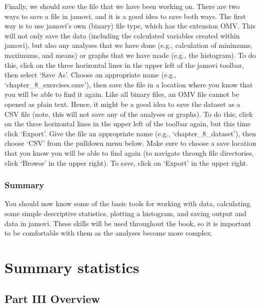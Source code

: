 \documentclass[
  openany]{scrbook}
\begin{document}
Finally, we should save the file that we have been working on.
There are two ways to save a file in jamovi, and it is a good idea to save both ways.
The first way is to use jamovi's own (binary) file type, which has the extension OMV.
This will not only save the data (including the calculated variables created within jamovi), but also any analyses that we have done (e.g., calculation of minimums, maximums, and means) or graphs that we have made (e.g., the histogram).
To do this, click on the three horizontal lines in the upper left of the jamovi toolbar, then select `Save As'.
Choose an appropriate name (e.g., `chapter\_8\_exercises.omv'), then save the file in a location where you know that you will be able to find it again.
Like all binary files, an OMV file cannot be opened as plain text.
Hence, it might be a good idea to save the dataset as a CSV file (note, this will not save any of the analyses or graphs).
To do this, click on the three horizontal lines in the upper left of the toolbar again, but this time click `Export'.
Give the file an appropriate name (e.g., `chapter\_8\_dataset'), then choose `CSV' from the pulldown menu below.
Make sure to choose a save location that you know you will be able to find again (to navigate through file directories, click `Browse' in the upper right).
To save, click on `Export' in the upper right.

\hypertarget{summary-1}{%
\section{Summary}\label{summary-1}}

You should now know some of the basic tools for working with data, calculating some simple descriptive statistics, plotting a histogram, and saving output and data in jamovi.
These skills will be used throughout the book, so it is important to be comfortable with them as the analyses become more complex.

\hypertarget{part-summary-statistics}{%
\part{Summary statistics}\label{part-summary-statistics}}

\hypertarget{Week3}{%
\chapter*{Part III Overview}\label{Week3}}
\end{document}
